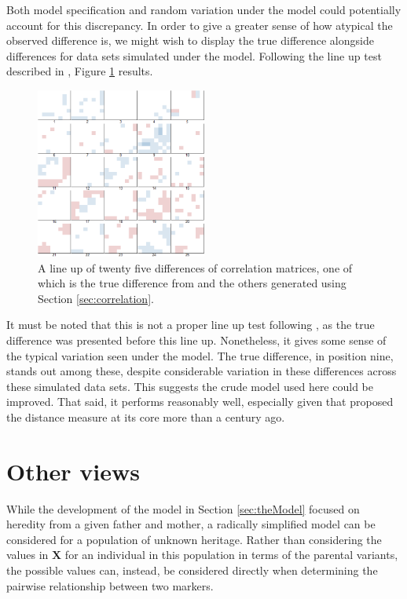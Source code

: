 \documentclass{article}
\newcommand{\m}[1]{\mathbf{#1}}               %
\begin{document}
Both model specification and random variation under the model could potentially account for this discrepancy. In order to give a greater sense of how atypical the observed difference is, we might wish to display the true difference alongside differences for data sets simulated under the model. Following the line up test described in \cite{bujaetal2009}, Figure \ref{fig:lineup} results.

\begin{figure}[htp]
  \begin{center}
    \includegraphics[width = 0.5\textwidth]{./img/lineup.png}
  \end{center}
  \caption{A line up of twenty five differences of correlation matrices, one of which is the true difference from \cite{cheverudetal2001} and the others generated using Section \ref{sec:correlation}.}
  \label{fig:lineup}
\end{figure}

It must be noted that this is not a proper line up test following \cite{bujaetal2009}, as the true difference was presented before this line up. Nonetheless, it gives some sense of the typical variation seen under the model. The true difference, in position nine, stands out among these, despite considerable variation in these differences across these simulated data sets. This suggests the crude model used here could be improved. That said, it performs reasonably well, especially given that \cite{haldane1919} proposed the distance measure at its core more than a century ago.

\section{Other views} \label{sec:apply}

While the development of the model in Section \ref{sec:theModel} focused on heredity from a given father and mother, a radically simplified model can be considered for a population of unknown heritage. Rather than considering the values in $\m{X}$ for an individual in this population in terms of the parental variants, the possible values can, instead, be considered directly when determining the pairwise relationship between two markers.
\end{document}
